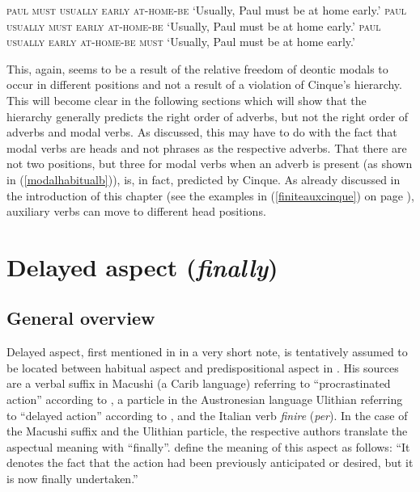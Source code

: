 \begin{exe}
\ex\label{modalhabitualb}\begin{xlist} 
\ex \textsc{paul must usually early at-home-be}
\glt `Usually, Paul must be at home early.'\label{modalhabitualba}
\ex \textsc{paul usually must early at-home-be}
\glt `Usually, Paul must be at home early.'\label{modalhabitualc}
\ex \textsc{paul usually early at-home-be must}
\glt `Usually, Paul must be at home early.'\label{modalhabitualbb}


\end{xlist}
\end{exe} 


\noindent This, again, seems to be a result of the relative freedom of deontic modals to occur in different positions and not a result of a violation of Cinque's hierarchy. This will become clear in the following sections which will show that the hierarchy generally predicts the right order of adverbs, but not the right order of adverbs and modal verbs. As discussed, this may have to do with the fact that modal verbs are heads and not phrases as the respective adverbs. That there are not two positions, but three for modal verbs when an adverb is present (as shown in (\ref{modalhabitualb})), is, in fact, predicted by Cinque. As already discussed in the introduction of this chapter (see the examples in (\ref{finiteauxcinque}) on page \pageref{finiteauxcinque}), auxiliary verbs can move to different head positions.


\section{Delayed aspect (\textit{finally})}
\subsection{General overview}

Delayed aspect, first mentioned in \citet[105]{cinque1999adverbs} in a very short note, is tentatively assumed to be located between habitual aspect and predispositional aspect in \citet[93]{cinque2006restructuring}. His sources are a verbal suffix in Macushi (a Carib language) referring to ``procrastinated action'' according to \citet[119]{macushi}, a particle in the Austronesian language Ulithian referring to ``delayed action'' according to \citet[116]{sohn1980ulithian}, and the Italian verb \textit{finire} (\textit{per}). In the case of the Macushi suffix and the Ulithian particle, the respective authors translate the aspectual meaning with ``finally''. \citet[116]{sohn1980ulithian} define the meaning of this aspect as follows: ``It denotes the fact that the action had been previously anticipated or desired, but it is now finally undertaken.''

